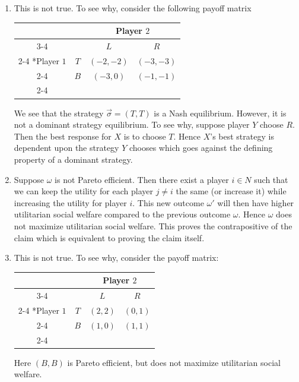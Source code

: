 \documentclass[a4paper]{article}
\begin{document}
\begin{exercise}{1}
\begin{enumerate}[label=(\alph*)]
    \item This is not true. To see why, consider the following payoff matrix
      \begin{table}[H]
        \setlength{\extrarowheight}{2pt}
        \centering
        \begin{tabular}{*{4}{c|}}
          \multicolumn{2}{c}{} & \multicolumn{2}{c}{Player $2$}\\\cline{3-4}
          \multicolumn{1}{c}{} &  & $L$  & $R$ \\\cline{2-4}
          \multirow{2}*{Player $1$}  & $T$ & $(-2, -2)$ & $(-3, -3)$ \\\cline{2-4}
                                     & $B$ & $(-3, 0)$ & $(-1, -1)$ \\\cline{2-4}
        \end{tabular}
      \end{table}
      We see that the strategy $ \vec{\sigma} = (T, T) $ is a Nash equilibrium. However, it is not a dominant strategy equilibrium. To see why, suppose player $ Y $ choose $ R $. Then the best response for $ X $ is to choose $ T $. Hence $ X $'s best strategy is dependent upon the strategy $ Y $ chooses which goes against the defining property of a dominant strategy.

    \item Suppose $ \omega $ is not Pareto efficient. Then there exist a player $ i \in N $ such that we can keep the utility for each player $ j \neq i $ the same (or increase it) while increasing the utility for player $ i $. This new outcome $ \omega' $ will then have higher utilitarian social welfare compared to the previous outcome $ \omega $. Hence $ \omega $ does not maximize utilitarian social welfare. This proves the contrapositive of the claim which is equivalent to proving the claim itself.

    \item This is not true. To see why, consider the payoff matrix:
      \begin{table}[H]
        \setlength{\extrarowheight}{2pt}
        \centering
        \begin{tabular}{*{4}{c|}}
          \multicolumn{2}{c}{} & \multicolumn{2}{c}{Player $2$}\\\cline{3-4}
          \multicolumn{1}{c}{} &  & $L$  & $R$ \\\cline{2-4}
          \multirow{2}*{Player $1$}  & $T$ & $(2, 2)$ & $(0, 1)$ \\\cline{2-4}
                                     & $B$ & $(1, 0)$ & $(1, 1)$ \\\cline{2-4}
        \end{tabular}
      \end{table}
      Here $ (B,B) $ is Pareto efficient, but does not maximize utilitarian social welfare.


\end{enumerate}
\end{exercise}
\end{document}
